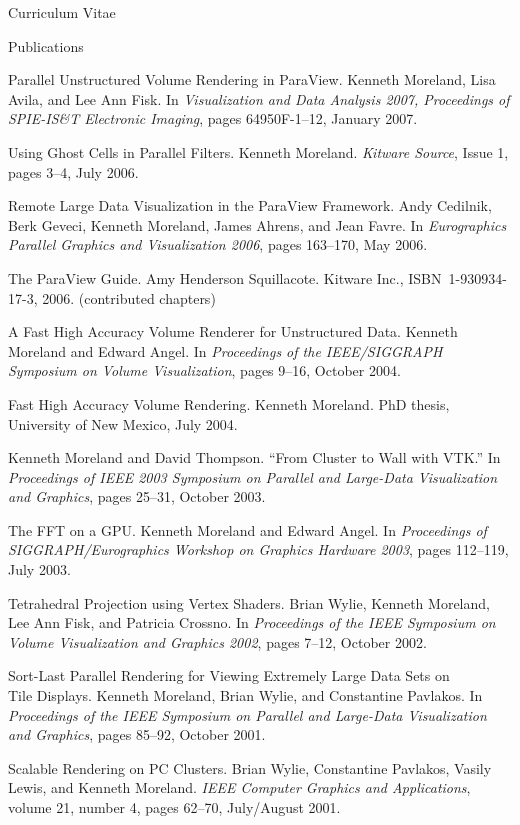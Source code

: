 \documentclass{article}
\begin{document}
\begin{cv}{Curriculum Vitae}
\begin{cvlist}{Publications}
    \item[Parallel Unstructured Volume Rendering in ParaView.] Kenneth
      Moreland, Lisa Avila, and Lee Ann Fisk.  In \emph{Visualization and
        Data Analysis 2007, Proceedings of SPIE-IS\&T Electronic Imaging},
      pages 64950F-1--12, January 2007.
    \item[Using Ghost Cells in Parallel Filters.] Kenneth Moreland.
      \emph{Kitware Source}, Issue 1, pages 3--4, July 2006.
    \item[Remote Large Data Visualization in the ParaView Framework.] Andy
      Cedilnik, Berk Geveci, Kenneth Moreland, James Ahrens, and Jean
      Favre.  In \emph{Eurographics Parallel Graphics and Visualization
        2006}, pages 163--170, May 2006.
    \item[The ParaView Guide.] Amy Henderson Squillacote.  Kitware
      Inc., ISBN~1-930934-17-3, 2006. (contributed chapters)
    \item[A Fast High Accuracy Volume Renderer for Unstructured Data.]
      Kenneth Moreland and Edward Angel.  In \emph{Proceedings of the
        IEEE/SIGGRAPH Symposium on Volume Visualization}, pages 9--16,
      October 2004.
    \item[Fast High Accuracy Volume Rendering.] Kenneth Moreland.  PhD
      thesis, University of New Mexico, July 2004.
    \item Kenneth Moreland and David Thompson.  ``From Cluster to Wall
      with VTK.''  In \emph{Proceedings of IEEE 2003 Symposium on
      Parallel and Large-Data Visualization and Graphics}, pages 25--31,
      October 2003.
    \item[The FFT on a GPU.] Kenneth Moreland and Edward Angel.  In
      \emph{Proceedings of SIGGRAPH/Eurographics Workshop on Graphics
        Hardware 2003}, pages 112--119, July 2003.
    \item[Tetrahedral Projection using Vertex Shaders.] Brian Wylie,
      Kenneth Moreland, Lee Ann Fisk, and Patricia Crossno.  In
      \emph{Proceedings of the IEEE Symposium on Volume Visualization and
        Graphics 2002}, pages 7--12, October 2002.
    \item[Sort-Last Parallel Rendering for Viewing Extremely Large Data
      Sets on]~\\ Tile Displays. Kenneth Moreland, Brian Wylie, and
      Constantine Pavlakos.  In \emph{Proceedings of the IEEE Symposium on
        Parallel and Large-Data Visualization and Graphics}, pages 85--92,
      October 2001.
    \item[Scalable Rendering on PC Clusters.] Brian Wylie, Constantine
      Pavlakos, Vasily Lewis, and Kenneth Moreland.  \emph{IEEE Computer
        Graphics and Applications}, volume 21, number 4, pages 62--70,
      July/August 2001.
    \end{cvlist}


\end{cv}
\end{document}
